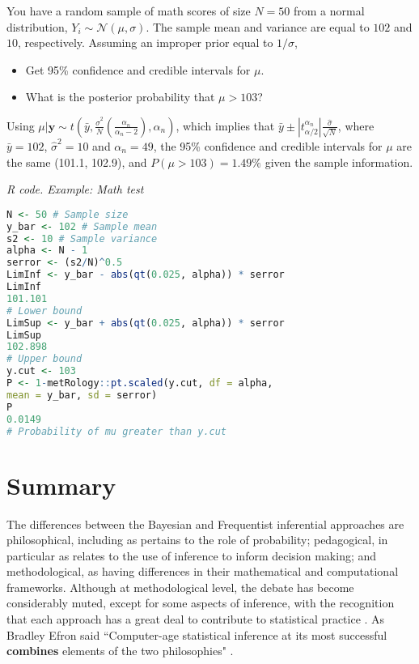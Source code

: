 You have a random sample of math scores of size $N=50$ from a normal distribution, $Y_i\sim \mathcal{N}(\mu, \sigma)$. The sample mean and variance are equal to $102$ and $10$, respectively. Assuming an improper prior equal to $1/\sigma$, 

\begin{itemize}
	\item Get 95\% confidence and credible intervals for $\mu$.
	\item What is the posterior probability that $\mu > 103$?  
\end{itemize}

Using $\mu|\mathbf{y}\sim t\left(\bar{y},\frac{\hat{\sigma}^2}{N}\left(\frac{\alpha_n}{\alpha_n-2}\right),\alpha_n\right)$, which implies that $\bar{y}\pm |t_{\alpha/2}^{\alpha_n}|\frac{\hat{\sigma}}{\sqrt{N}}$, where $\bar{y}=102$, $\hat{\sigma}^2=10$ and $\alpha_n=49$, the 95\% confidence and credible intervals for $\mu$ are the same (101.1, 102.9), and $P(\mu>103)=1.49\%$ given the sample information.

\begin{tcolorbox}[enhanced,width=4.67in,center upper,
	fontupper=\large\bfseries,drop shadow southwest,sharp corners]
	\textit{R code. Example: Math test}
\begin{VF}
\begin{lstlisting}[basicstyle=\footnotesize, language=R]
N <- 50 # Sample size
y_bar <- 102 # Sample mean
s2 <- 10 # Sample variance
alpha <- N - 1
serror <- (s2/N)^0.5 
LimInf <- y_bar - abs(qt(0.025, alpha)) * serror
LimInf
101.101
# Lower bound
LimSup <- y_bar + abs(qt(0.025, alpha)) * serror
LimSup
102.898
# Upper bound
y.cut <- 103
P <- 1-metRology::pt.scaled(y.cut, df = alpha, 
mean = y_bar, sd = serror)
P
0.0149
# Probability of mu greater than y.cut
\end{lstlisting}
\end{VF}
\end{tcolorbox}



\section{Summary}\label{sec27}

The differences between the Bayesian and Frequentist inferential approaches are philosophical, including as pertains to the role of probability; pedagogical, in particular as relates to the use of inference to inform decision making; and methodological, as having differences in their mathematical and computational frameworks. Although at methodological level, the debate has become considerably muted, except for some aspects of inference, with the recognition that each approach has a great deal to contribute to statistical practice \cite{Good1992, Bayarri2004, Kass2011}. As Bradley Efron said ``Computer-age statistical inference at its most successful \textbf{combines} elements of the two philosophies" \cite{efron2016computer}.

